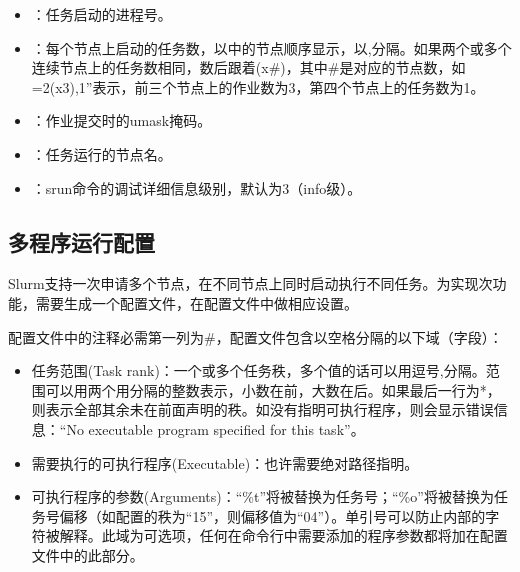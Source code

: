 \documentclass[a4paper,12pt,english]{sphinxmanual}
\begin{document}
\begin{itemize}
\item {} 
\sphinxAtStartPar
{}：任务启动的进程号。

\item {} 
\sphinxAtStartPar
{}：每个节点上启动的任务数，以中的节点顺序显示，以,分隔。如果两个或多个连续节点上的任务数相同，数后跟着(x\#)，其中\#是对应的节点数，如=2(x3),1”表示，前三个节点上的作业数为3，第四个节点上的任务数为1。

\item {} 
\sphinxAtStartPar
{}：作业提交时的umask掩码。

\item {} 
\sphinxAtStartPar
{}：任务运行的节点名。

\item {} 
\sphinxAtStartPar
{}：srun命令的调试详细信息级别，默认为3（info级）。

\end{itemize}


\subsection{多程序运行配置}
\label{\detokenize{slurm/slurm:id23}}
\sphinxAtStartPar
Slurm支持一次申请多个节点，在不同节点上同时启动执行不同任务。为实现次功能，需要生成一个配置文件，在配置文件中做相应设置。

\sphinxAtStartPar
配置文件中的注释必需第一列为\#，配置文件包含以空格分隔的以下域（字段）：
\begin{itemize}
\item {} 
\sphinxAtStartPar
任务范围(Task rank)：一个或多个任务秩，多个值的话可以用逗号,分隔。范围可以用两个用\sphinxhyphen{}分隔的整数表示，小数在前，大数在后。如果最后一行为*，则表示全部其余未在前面声明的秩。如没有指明可执行程序，则会显示错误信息：“No executable program specified for this task”。

\item {} 
\sphinxAtStartPar
需要执行的可执行程序(Executable)：也许需要绝对路径指明。

\item {} 
\sphinxAtStartPar
可执行程序的参数(Arguments)：“\%t”将被替换为任务号；“\%o”将被替换为任务号偏移（如配置的秩为“1\sphinxhyphen{}5”，则偏移值为“0\sphinxhyphen{}4”）。单引号可以防止内部的字符被解释。此域为可选项，任何在命令行中需要添加的程序参数都将加在配置文件中的此部分。

\end{itemize}
\end{document}
